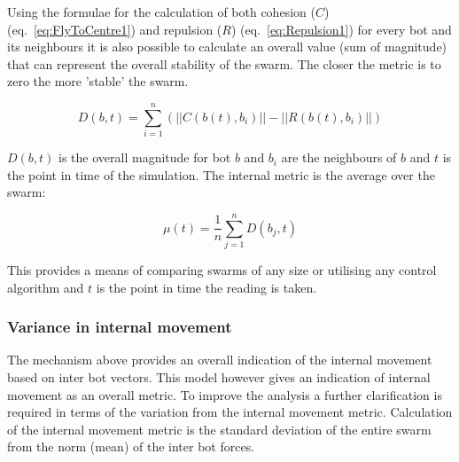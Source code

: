 \documentclass[10pt,journal,letterpaper,twoside]{IEEEtran}
\newcommand{\stability}{internal movement}
\newcommand{\Eq}{eq.}
\begin{document}
Using the formulae for the calculation of both cohesion ($C$)
(\Eq{}~\ref{eq:FlyToCentre1}) and repulsion ($R$)
(\Eq{}~\ref{eq:Repulsion1}) for every bot and its neighbours it is
also possible to calculate an overall value (sum of magnitude) that
can represent the overall stability of the swarm. The closer the
metric is to zero the more 'stable' the swarm.


\begin{equation}
\label{eq:BotStabilityT}
D(b,t) = \sum_{i=1}^{n}(||C(b(t),b_{i})|| - ||R(b(t),b_{i})||)
\end{equation}

$D(b,t)$ is the overall magnitude for bot $b$ and $b_i$ are the
neighbours of $b$ and $t$ is the point in time of the simulation. The
internal metric is the average over the swarm:




\begin{equation}
\label{eq:SwarmStabilityMetricT}
\mu(t) = \frac{1}{n}{\sum_{j=1}^{n}D(b_j,t)}
\end{equation}

This provides a means of comparing swarms of any size or utilising any
control algorithm and $t$ is the point in time the reading is taken.

\subsubsection{Variance in \stability{}}\label{Section:VarienceInStability}

The mechanism above provides an overall indication of the \stability{}
based on inter bot vectors. This model however gives an indication of
\stability{} as an overall metric. To improve the analysis a further
clarification is required in terms of the variation from the
\stability{} metric. Calculation of the \stability{} metric is the
standard deviation of the entire swarm from the norm (mean) of the
inter bot forces.
\end{document}
